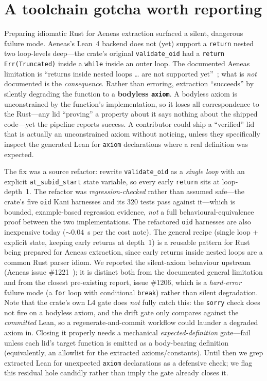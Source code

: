 \documentclass[10pt,twocolumn]{article}
\newcommand{\code}[1]{\texttt{\small #1}}
\begin{document}
\section{A toolchain gotcha worth reporting}
\label{sec:gotcha}

Preparing idiomatic Rust for Aeneas extraction surfaced a silent, dangerous
failure mode. Aeneas's Lean~4 backend does not (yet) support a \code{return}
nested two loop-levels deep---the crate's original \code{validate\_oid} had a
\code{return Err(Truncated)} inside a \code{while} inside an outer loop. The
documented Aeneas limitation is ``returns inside nested loops \ldots{} are not
supported yet''~\cite{aeneas}; what is \emph{not} documented is the
\emph{consequence}. Rather than erroring, extraction ``succeeds'' by silently
degrading the function to a \textbf{bodyless \code{axiom}}. A bodyless axiom is
unconstrained by the function's implementation, so it loses all correspondence
to the Rust---any lid ``proving'' a property about it says nothing about the
shipped code---yet the pipeline reports success. A contributor could ship a
``verified'' lid that is actually an unconstrained axiom without noticing,
unless they specifically inspect the generated Lean for \code{axiom}
declarations where a real definition was expected.

The fix was a source refactor: rewrite \code{validate\_oid} as a \emph{single
loop} with an explicit \code{at\_subid\_start} state variable, so every early
\code{return} sits at loop-depth~1. The refactor was \emph{regression-checked}
rather than assumed safe---the crate's five \code{oid} Kani harnesses and its 320
tests pass against it---which is bounded, example-based regression evidence,
\emph{not} a full behavioural-equivalence proof between the two implementations.
The refactored \code{oid} harnesses are also inexpensive today (${\sim}0.04$~s
per the cost note). The general recipe
(single loop + explicit state, keeping early returns at depth~1) is a reusable
pattern for Rust being prepared for Aeneas extraction, since early returns
inside nested loops are a common Rust parser idiom. We reported the silent-axiom
behaviour upstream (Aeneas issue \#1221~\cite{aeneasissue}); it is distinct
both from the documented general limitation and from the closest pre-existing
report, issue \#1206, which is a \emph{hard-error} failure mode (a \code{for}
loop with conditional \code{break}) rather than silent degradation. Note that
the crate's own L4 gate does \emph{not} fully catch this: the \code{sorry} check
does not fire on a bodyless axiom, and the drift gate only compares against the
\emph{committed} Lean, so a regenerate-and-commit workflow could launder a
degraded axiom in. Closing it properly needs a mechanical \emph{expected-definition}
gate---fail unless each lid's target function is emitted as a body-bearing
definition (equivalently, an allowlist for the extracted axioms/constants).
Until then we grep extracted Lean for unexpected \code{axiom} declarations as a
defensive check; we flag this residual hole candidly rather than imply the gate
already closes it.
\end{document}
